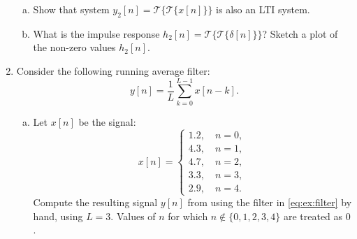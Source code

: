 \begin{enumerate}
\begin{enumerate}[a)]
          \item Show that system $y_2[n]=\mathcal{T}\{ \mathcal{T}\{x[n]\} \}$ is also an LTI system.
          \item What is the impulse response $h_2[n]=\mathcal{T}\{\mathcal{T}\{\delta[n]\}\}$?
                Sketch a plot of the non-zero values $h_2[n]$.
        \end{enumerate}

  \item Consider the following running average filter:
        \begin{equation}
          y[n] = \frac{1}{L}\sum_{k = 0}^{L - 1}x[n - k].
          \label{eq:ex:filter}
        \end{equation}

        \begin{enumerate}[a)]
          \item Let $x[n]$ be the signal:
                \[
                  x[n] = \begin{cases}
                    1.2, \quad n = 0, \\
                    4.3, \quad n = 1, \\
                    4.7, \quad n = 2, \\
                    3.3, \quad n = 3, \\
                    2.9, \quad n = 4.
                  \end{cases}
                \]
                Compute the resulting signal $y[n]$ from using the filter in \ref*{eq:ex:filter}
                by hand, using $L = 3$. Values of $n$ for which $n \notin \{0, 1, 2, 3, 4\}$
                are treated as $0$.


\end{enumerate}
\end{enumerate}
